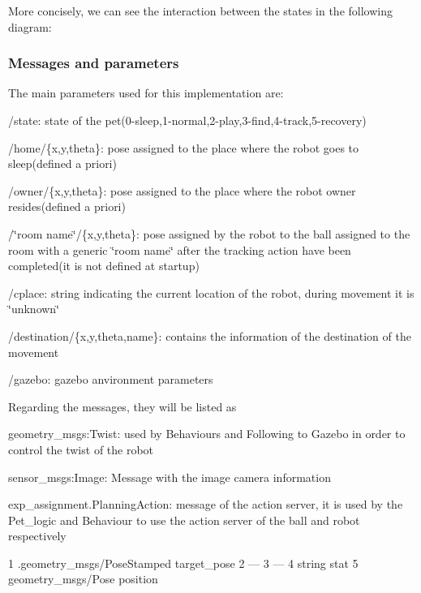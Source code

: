 More concisely, we can see the interaction between the states in the following diagram\+:

\subsubsection*{Messages and parameters}

The main parameters used for this implementation are\+:
\begin{DoxyItemize}
\item /state\+: state of the pet(0-\/sleep,1-\/normal,2-\/play,3-\/find,4-\/track,5-\/recovery)
\item /home/\{x,y,theta\}\+: pose assigned to the place where the robot goes to sleep(defined a priori)
\item /owner/\{x,y,theta\}\+: pose assigned to the place where the robot owner resides(defined a priori)
\item /\char`\"{}room name\char`\"{}/\{x,y,theta\}\+: pose assigned by the robot to the ball assigned to the room with a generic \char`\"{}room name\char`\"{} after the tracking action have been completed(it is not defined at startup)
\item /cplace\+: string indicating the current location of the robot, during movement it is \char`\"{}unknown\char`\"{}
\item /destination/\{x,y,theta,name\}\+: contains the information of the destination of the movement
\item /gazebo\+: gazebo anvironment parameters
\end{DoxyItemize}

Regarding the messages, they will be listed as
\begin{DoxyItemize}
\item geometry\+\_\+msgs\+:\+Twist\+: used by Behaviours and Following to Gazebo in order to control the twist of the robot
\item sensor\+\_\+msgs\+:\+Image\+: Message with the image camera information
\item exp\+\_\+assignment.\+Planning\+Action\+: message of the action server, it is used by the Pet\+\_\+logic and Behaviour to use the action server of the ball and robot respectively 
\begin{DoxyCode}
1 .geometry\_msgs/PoseStamped target\_pose
2 ---
3 ---
4 string stat
5 geometry\_msgs/Pose position
\end{DoxyCode}

\end{DoxyItemize}

